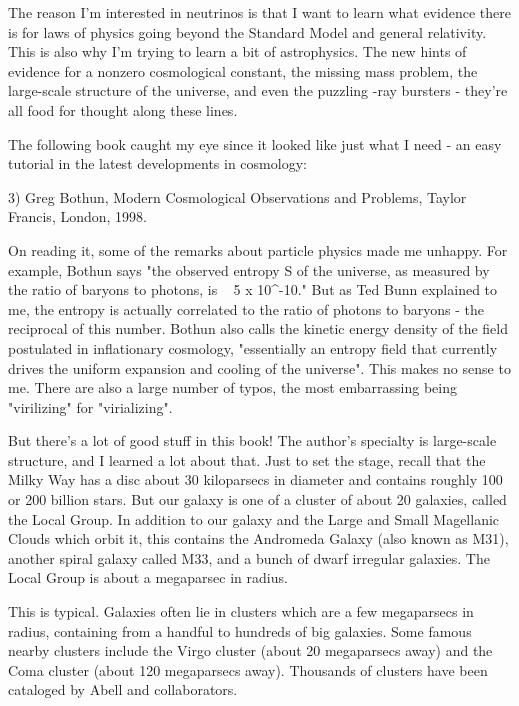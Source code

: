 The reason I'm interested in neutrinos is that I want to learn what
evidence there is for laws of physics going beyond the Standard Model
and general relativity.  This is also why I'm trying to learn a bit of
astrophysics.  The new hints of evidence for a nonzero cosmological
constant, the missing mass problem, the large-scale structure of the
universe, and even the puzzling \gamma -ray bursters - they're all food
for thought along these lines.  

The following book caught my eye since it looked like just what I 
need - an easy tutorial in the latest developments in cosmology:

3) Greg Bothun, Modern Cosmological Observations and Problems, Taylor \text{\&} 
Francis, London, 1998.

On reading it, some of the remarks about particle physics made me
unhappy.  For example, Bothun says "the observed entropy S of the
universe, as measured by the ratio of baryons to photons, is ~ 5 x
10^{-10}." But as Ted Bunn explained to me, the entropy is
actually correlated to the ratio of photons to baryons - the reciprocal
of this number.  Bothun also calls the kinetic energy density of the
field postulated in inflationary cosmology, "essentially an entropy
field that currently drives the uniform expansion and cooling of the
universe".  This makes no sense to me.  There are also a large
number of typos, the most embarrassing being "virilizing" for
"virializing".

But there's a lot of good stuff in this book!  The author's specialty is
large-scale structure, and I learned a lot about that.  Just to set the
stage, recall that the Milky Way has a disc about 30 kiloparsecs in
diameter and contains roughly 100 or 200 billion stars.  But our galaxy
is one of a cluster of about 20 galaxies, called the Local Group.  In
addition to our galaxy and the Large and Small Magellanic Clouds which
orbit it, this contains the Andromeda Galaxy (also known as M31),
another spiral galaxy called M33, and a bunch of dwarf irregular
galaxies.  The Local Group is about a megaparsec in radius.

This is typical.  Galaxies often lie in clusters which are a few
megaparsecs in radius, containing from a handful to hundreds of big
galaxies.  Some famous nearby clusters include the Virgo cluster (about
20 megaparsecs away) and the Coma cluster (about 120 megaparsecs away).
Thousands of clusters have been cataloged by Abell and collaborators.

